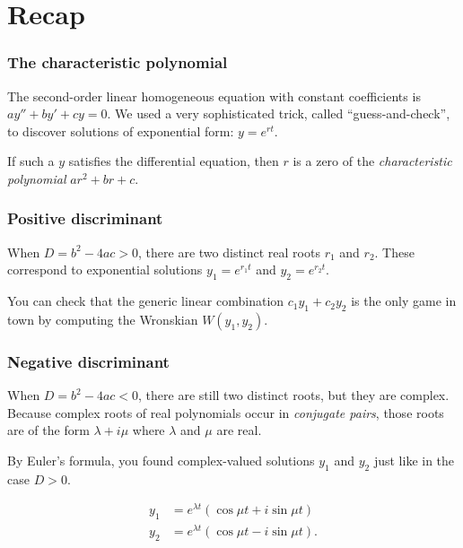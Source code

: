 \def\encoding{UTF-8}

\def\mytitle{Repeated Roots}
\def\subtitle{Second-order Linear Homogeneous Equations}
\def\affiliation{The College of Idaho}
\def\mydate{20 March 2013}
\def\latexmode{beamer}
\def\fonttheme{structurebold}
\def\colortheme{crane}
\def\theme{Szeged}

\section{Recap}
\label{recap}

\begin{frame}

\frametitle{The characteristic polynomial}
\label{thecharacteristicpolynomial}

The second-order linear homogeneous equation with constant coefficients is
$ ay'' + by' + cy = 0 $. We used a very sophisticated trick, called ``guess-and-check'', to discover solutions of exponential form: $ y = e^{rt} $.

 \pause 

If such a $ y $ satisfies the differential equation, then $ r $ is a zero of the \emph{characteristic polynomial} $ ar^2 + br + c $.

\end{frame}

\begin{frame}

\frametitle{Positive discriminant}
\label{positivediscriminant}

When $ D = b^2 - 4ac > 0 $, there are two distinct real roots $ r_1 $ and $ r_2 $. These correspond to exponential solutions $ y_1 = e^{r_1 t} $ and $ y_2 = e^{r_2 t} $.

You can check that the generic linear combination $ c_1 y_1 + c_2 y_2 $ is the only game in town by computing the Wronskian $ W(y_1, y_2) $.

\end{frame}

\begin{frame}

\frametitle{Negative discriminant}
\label{negativediscriminant}

When $ D = b^2 - 4ac < 0 $, there are still two distinct roots, but they are complex. Because complex roots of real polynomials occur in \emph{conjugate pairs}, those roots are of the form $ \lambda + i \mu $ where $ \lambda $ and $ \mu $ are real.

By Euler's formula, you found complex-valued solutions $ y_1 $ and $ y_2 $ just like in the case $ D > 0 $.
 
\begin{align*} 
    y_1 &= e^{\lambda t} (\cos{\mu t} + i \sin{\mu t}) \\
    y_2 &= e^{\lambda t} (\cos{\mu t} - i \sin{\mu t}). 
\end{align*}


\end{frame}

